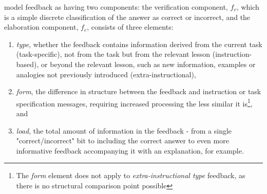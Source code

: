 \citet{kulhavy_feedback_1989} model feedback as having two components: the verification component, $f_v$, which is a simple discrete classification of the answer as correct or incorrect, and the elaboration component, $f_e$, consists of three elements:
\begin{enumerate}[itemsep=0.05em,label=(\roman*)]
    \item \textit{type}, whether the feedback contains information derived from the current task (task-specific), not from the task but from the relevant lesson (instruction-based), or beyond the relevant lesson, such as new information, examples or analogies not previously introduced (extra-instructional), 
    \item \textit{form}, the difference in structure between the feedback and instruction or task specification messages, requiring increased processing the less similar it is\footnote{The \textit{form} element does not apply to \textit{extra-instructional type} feedback, as there is no structural comparison point possible}, and
    \item \textit{load}, the total amount of information in the feedback - from a single "correct/incorrect" bit to including the correct answer to even more informative feedback accompanying it with an explanation, for example.
\end{enumerate}


